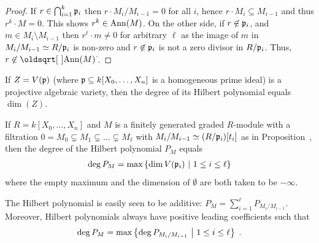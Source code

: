 \documentclass[a4paper,parskip=half,numbers=enddot, DIV=12]{scrreprt}
\begin{document}
\begin{proof}
    If $r\in \bigcap_{i=1}^k\mathfrak{p}_i$ then $r\cdot M_i/M_{i-1} = 0$ for all $i$, hence $r\cdot M_i\subseteq M_{i-1}$ and thus $r^k\cdot M =0$. This shows $r^k\in \operatorname{Ann}(M)$. On the other side, if $r\not\in \mathfrak{p}_i$, and $m\in M_i\setminus M_{i-1}$ then $r^\ell\cdot m \neq 0$ for arbitrary $\ell$ as the image of $m$ in $M_i/M_{i-1} \simeq R/\mathfrak{p}_i$ is non-zero and $r\not\in \mathfrak{p}_i$ is not a zero divisor in $R/\mathfrak{p}_i$. Thus, $r\not\in \sqrt{\Ann(M)}$.
\end{proof}
\begin{prop}
    \begin{alphanumerate}
    \item {}
        If $Z=V(\mathfrak{p})$ (where $\mathfrak{p}\subseteq k[X_0,\ldots, X_n]$ is a homogeneous prime ideal) is a projective algebraic variety, then the degree of its Hilbert polynomial equals $\dim(Z)$.
    \item 
        If $R=k[X_0,\ldots, X_n]$ and $M$ is a finitely generated graded $R$-module with a filtration $0=M_0\subsetneq M_1\subsetneq\ldots\subsetneq M_\ell$ with $M_i/M_{i-1}\simeq (R/\mathfrak{p}_i)[t_i]$ as in Proposition~, then the degree of the Hilbert polynomial $P_M$ equals
        \begin{align*}
            \deg P_M=\max\left\{\dim V(\mathfrak{p}_i)\ \middle|\  1\leq i\leq \ell\right\}
        \end{align*}
        where the empty maximum and the dimension of $\emptyset$ are both taken to be $-\infty$.
    \end{alphanumerate}
\end{prop}
\begin{rem*}
    The Hilbert polynomial is easily seen to be additive: $P_M=\sum_{i=1}^\ell P_{M_i/M_{i-1}}$. Moreover, Hilbert polynomials always have positive leading coefficients such that 
    \begin{align*}
    	\deg P_M = \max\left\{\deg P_{M_i/M_{i-1}}\ \middle|\  1\leq i\leq \ell\right\}\;.
    \end{align*}
\end{rem*}
\end{document}
